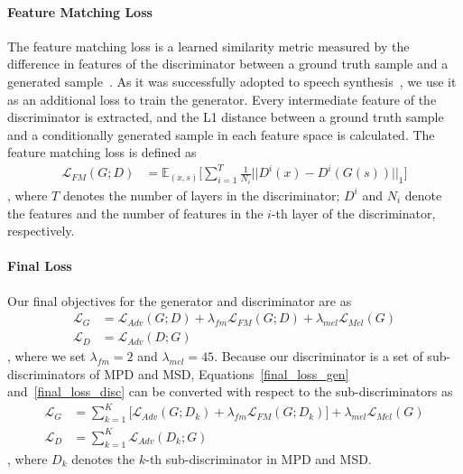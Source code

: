 \paragraph{Feature Matching Loss} The feature matching loss is a learned similarity metric measured by the difference in features of the discriminator between a ground truth sample and a generated sample~\citep{larsen2016autoencoding, Kumar2018melgan}. As it was successfully adopted to speech synthesis~\citep{Kumar2018melgan}, we use it as an additional loss to train the generator. Every intermediate feature of the discriminator is extracted, and the L1 distance between a ground truth sample and a conditionally generated sample in each feature space is calculated. The feature matching loss is defined as
\begin{align}
    \mathcal{L}_{FM}(G; D) &= \mathbb{E}_{(x, s)} \Bigg[\sum_{i=1}^{T}\frac{1}{N_{i}}||D^i(x)-D^i(G(s))||_{1}\Bigg]
\end{align}
, where $T$ denotes the number of layers in the discriminator; $D^i$ and $N_i$ denote the features and the number of features in the $i$-th layer of the discriminator, respectively.

\paragraph{Final Loss} Our final objectives for the generator and discriminator are as
\begin{align}
    \mathcal{L}_{G} &= \mathcal{L}_{Adv}(G; D) + \lambda_{fm}\mathcal{L}_{FM}(G; D) + \lambda_{mel}\mathcal{L}_{Mel}(G)
    \label{final_loss_gen} \\
    \mathcal{L}_{D} &= \mathcal{L}_{Adv}(D; G)
    \label{final_loss_disc}
\end{align}
, where we set $\lambda_{fm}=2$ and $\lambda_{mel}=45$.
Because our discriminator is a set of sub-discriminators of MPD and MSD, Equations~\ref{final_loss_gen} and~\ref{final_loss_disc} can be converted with respect to the sub-discriminators as
\begin{align}
    \mathcal{L}_{G} &= \sum_{k=1}^{K}\Bigg[\mathcal{L}_{Adv}(G; D_k) + \lambda_{fm}\mathcal{L}_{FM}(G; D_k)\Bigg] + \lambda_{mel}\mathcal{L}_{Mel}(G)\\
    \mathcal{L}_{D} &= \sum_{k=1}^{K}\mathcal{L}_{Adv}(D_k; G)
\end{align}
, where $D_k$ denotes the $k$-th sub-discriminator in MPD and MSD.